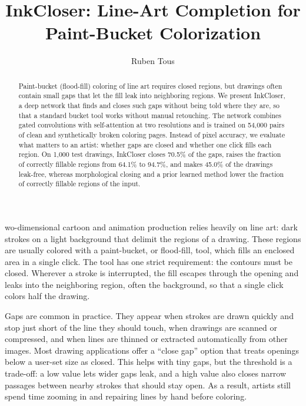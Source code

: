 \documentclass{IEEEcsmag}
\begin{document}


\title{InkCloser: Line-Art Completion for Paint-Bucket Colorization}

\author{Ruben Tous}


\begin{abstract}
Paint-bucket (flood-fill) coloring of line art requires closed regions, but drawings
often contain small gaps that let the fill leak into neighboring regions. We present
InkCloser, a deep network that finds and closes such gaps without being told where
they are, so that a standard bucket tool works without manual retouching. The
network combines gated convolutions with self-attention at two resolutions and is trained on 54,000 pairs of clean and synthetically broken coloring pages. Instead of pixel accuracy, we evaluate what matters
to an artist: whether gaps are closed and whether one click fills each region. On
1,000 test drawings, InkCloser closes 70.5\% of the gaps, raises the fraction of
correctly fillable regions from 64.1\% to 94.7\%, and makes 45.0\% of the drawings
leak-free, whereas morphological closing and a prior learned method lower the fraction of correctly fillable regions of the input.
\end{abstract}

\maketitle

wo-dimensional cartoon and animation production relies heavily on line
art: dark strokes on a light background that delimit the regions of a drawing. These
regions are usually colored with a paint-bucket, or flood-fill, tool, which fills an
enclosed area in a single click. The tool has one strict requirement: the contours
must be closed. Wherever a stroke is interrupted, the fill escapes through the
opening and leaks into the neighboring region, often the background, so that a
single click colors half the drawing.

Gaps are common in practice. They appear when strokes are drawn quickly and stop
just short of the line they should touch, when drawings are scanned or compressed,
and when lines are thinned or extracted automatically from other images. Most
drawing applications offer a ``close gap'' option that treats openings below a
user-set size as closed. This helps with tiny gaps, but the threshold is a
trade-off: a low value lets wider gaps leak, and a high value also closes narrow
passages between nearby strokes that should stay open. As a result, artists still
spend time zooming in and repairing lines by hand before coloring.
\end{document}

